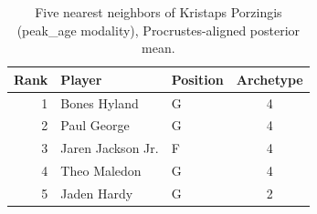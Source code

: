 \begin{table}[htbp]
  \centering\small
  \begin{tabular}{rllc}
    \toprule
    Rank & Player & Position & Archetype \\
    \midrule
    1 & Bones Hyland & G & 4 \\
    2 & Paul George & G & 4 \\
    3 & Jaren Jackson Jr. & F & 4 \\
    4 & Theo Maledon & G & 4 \\
    5 & Jaden Hardy & G & 2 \\
    \bottomrule
  \end{tabular}
  \caption{Five nearest neighbors of Kristaps Porzingis (peak_age modality), Procrustes-aligned posterior mean.}
  \label{tab:Kristaps_Porzingis_neighbors_peak_age}
\end{table}

